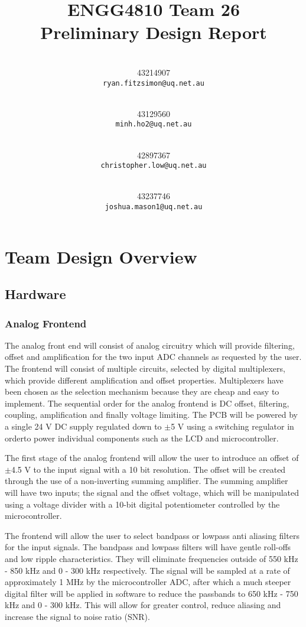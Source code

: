 \documentclass[12pt]{report}
\title{\vspace{-2cm}ENGG4810 Team 26\\
	Preliminary Design Report\vspace{1cm}}
\author{
	\makebox[.4\linewidth]{Ryan Fitzimon}\\
	43214907\\
	\texttt{ryan.fitzsimon@uq.net.au}
	\and
	\makebox[.4\linewidth]{Minh Toan Ho}\\
	43129560\\
	\texttt{minh.ho2@uq.net.au}
	\and
	\makebox[.4\linewidth]{Christopher Low}\\
	42897367\\
	\texttt{christopher.low@uq.net.au}
	\and
	\makebox[.4\linewidth]{Joshua Mason}\\
	43237746\\
	\texttt{joshua.mason1@uq.net.au}
	\vspace{1cm}
}
\begin{document}
\maketitle

\chapter{Team Design Overview}
\section{Hardware}
\subsection{Analog Frontend}
The analog front end will consist of analog circuitry which will provide filtering, offset and amplification for the two input ADC channels as requested by the user. The frontend will consist of multiple circuits, selected by digital multiplexers, which provide different amplification and offset properties. Multiplexers have been chosen as the selection mechanism because they are cheap and easy to implement. The sequential order for the analog frontend is DC offset, filtering, coupling, amplification and finally voltage limiting. The PCB will be powered by a single 24 V DC supply regulated down to $\pm$5 V using a switching regulator in orderto power individual components such as the LCD and microcontroller.

The first stage of the analog frontend will allow the user to introduce an offset of $\pm$4.5 V to the input signal with a 10 bit resolution. The offset will be created through the use of a non-inverting summing amplifier. The summing amplifier will have two inputs; the signal and the offset voltage, which will be manipulated using a voltage divider with a 10-bit digital potentiometer controlled by the microcontroller.

The frontend will allow the user to select bandpass or lowpass anti aliasing filters for the input signals. The bandpass and lowpass filters will have gentle roll-offs and low ripple characteristics. They will eliminate frequencies outside of 550 kHz - 850 kHz and 0 - 300 kHz respectively. The signal will be sampled at a rate of approximately 1 MHz by the microcontroller ADC, after which a much steeper digital filter will be applied in software to reduce the passbands to 650 kHz - 750 kHz and 0 - 300 kHz. This will allow for greater control, reduce aliasing and increase the signal to noise ratio (SNR).
\end{document}
